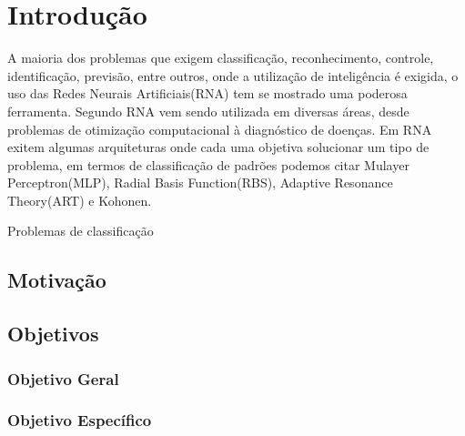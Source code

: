 \chapter{Introdução}
\label{cap:introducao}
A maioria dos problemas que exigem classificação, reconhecimento, controle, identificação,
previsão, entre outros, onde a utilização de inteligência é exigida, o uso das Redes
Neurais Artificiais(RNA) tem se mostrado uma poderosa ferramenta. Segundo  RNA vem sendo utilizada em diversas áreas, desde problemas de otimização computacional à diagnóstico
de doenças. Em RNA exitem algumas arquiteturas onde cada uma objetiva
solucionar um tipo de problema, em termos de classificação de padrões podemos citar Mulayer Perceptron(MLP), Radial Basis Function(RBS), Adaptive Resonance Theory(ART) e Kohonen. 

Problemas de classificação 


\section{Motivação}
\label{sec:motivacao}


\section{Objetivos}
\label{sec:objetivos}

\subsection{Objetivo Geral}
\label{sec:objetivo-geral}

\subsection{Objetivo Específico}
\label{sec:objetivo-específico}
